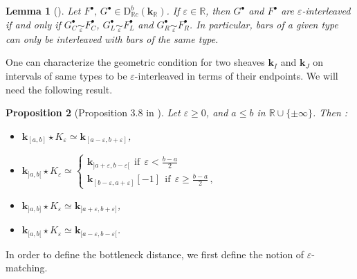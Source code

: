 \documentclass[a4paper, english, 11pt]{article}
\newcommand{\kk}[0]{\textbf{k}}
\newcommand{\0}{\vec{0}}
\newcommand{\R}[0]{\mathbb{R}}
\newcommand{\D}[0]{\text{D}}
\newtheorem{prop}{Proposition}[section]
\newtheorem{lem}[prop]{Lemma}
\begin{document}
\begin{lem}[\cite{Berk18}]\label{L:Caracinterleaving} Let $F^\bullet, \, G^\bullet \in \D^b_{\R c}(\kk_\R)$.
If $\varepsilon \in \R$, then $G^\bullet$ and $F^\bullet$ are $\varepsilon$-interleaved if and only if 
 $G_C^\bullet \mathop{\sim}\limits_{\varepsilon} F_C^\bullet$, $G_L^\bullet \mathop{\sim}\limits_{\varepsilon} F_L^\bullet$ and $G_R^\bullet \mathop{\sim}\limits_{\varepsilon} F_R^\bullet$. In particular, 
  bars of a given type can only be interleaved with bars of the same type.
\end{lem}
One can characterize the geometric  condition for two sheaves $\kk_I$ and $\kk_J$ on intervals of  same types to be $\varepsilon$-interleaved in terms of their endpoints. 
We will need the following result.
\begin{prop}[Proposition 3.8 in \cite{Berk18}]\label{P:P38Berk18}
Let $\varepsilon \geq 0$, and $a\leq b$ in $\R \cup \{\pm \infty\}$. Then : 
\begin{itemize}
\item[$\bullet$] $\kk_{[a,b]}\star K_\varepsilon \simeq \kk_{[a-\varepsilon, b + \varepsilon]} $,
\item[$\bullet$] $\kk_{]a,b[}\star K_\varepsilon \simeq 
\begin{cases}
\kk_{]a+\varepsilon,b-\varepsilon[} ~~\text{if} ~~\varepsilon < \frac{b-a }{2} \\
\kk_{[b- \varepsilon , a+ \varepsilon]}[-1] ~~\text{if} ~~\varepsilon \geq \frac{b-a }{2}\, ,
\end{cases}$

\item[$\bullet$] $\kk_{]a,b]}\star K_\varepsilon \simeq \kk_{]a+\varepsilon, b + \varepsilon]} $,
\item[$\bullet$] $\kk_{[a,b[}\star K_\varepsilon \simeq \kk_{[a-\varepsilon, b - \varepsilon[} $.
\end{itemize}
\end{prop}


 In order to define the bottleneck distance, we first define the notion of $\varepsilon$-matching. 
 
\end{document}
